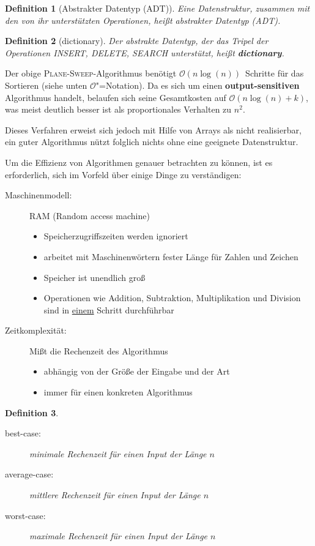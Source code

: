 \documentclass[ngerman,draft,parskip=half*,twoside]{scrreprt}
\theoremstyle{break}
\newtheorem{definition}{Definition}[chapter]
\theoremstyle{nonumberbreak}
\newcommand*{\OO}{\mathcal{O}}      %
\begin{document}
\begin{definition}[Abstrakter Datentyp (ADT)]
  Eine Datenstruktur, zusammen mit den von ihr unterstützten Operationen, 
  heißt abstrakter Datentyp (ADT).
\end{definition}

\begin{definition}[dictionary]
  Der abstrakte Datentyp, der das Tripel der Operationen \textit{INSERT},
  \textit{DELETE}, \textit{SEARCH} unterstützt, heißt \textbf{dictionary}.
\end{definition}

Der obige \textsc{Plane-Sweep}-Algorithmus benötigt $\OO(n\log(n))$~Schritte
für das Sortieren (siehe unten $\OO$"=Notation). Da es sich um einen \textbf{output-sensitiven}
Algorithmus handelt, belaufen sich seine Gesamtkosten auf
$\OO(n\log(n)+k)$, was meist deutlich besser ist als proportionales Verhalten
zu $n^2$.

Dieses Verfahren erweist sich jedoch mit Hilfe von Arrays als nicht
realisierbar, ein guter Algorithmus nützt folglich nichts ohne eine
geeignete Datenstruktur.

Um die Effizienz von Algorithmen genauer betrachten zu können, ist es
erforderlich, sich im Vorfeld über einige Dinge zu verständigen:

\begin{description}
 \item[Maschinenmodell:] RAM (Random access machine)
  \begin{itemize}
   \item Speicherzugriffszeiten werden ignoriert
   \item arbeitet mit Maschinenwörtern fester Länge für Zahlen und Zeichen
   \item Speicher ist unendlich groß
   \item Operationen wie Addition, Subtraktion, Multiplikation und Division
    sind in \underline{einem} Schritt durchführbar
  \end{itemize}
 \item[Zeitkomplexität:] Mißt die Rechenzeit des Algorithmus
  \begin{itemize}
   \item{abhängig von der Größe der Eingabe und der Art}
   \item{immer für einen konkreten Algorithmus}
  \end{itemize}
\end{description}

\begin{definition}
  \begin{description}
   \item[best-case:] minimale Rechenzeit für einen Input der Länge $n$
   \item[average-case:] mittlere Rechenzeit für einen Input der Länge $n$
   \item[worst-case:] maximale Rechenzeit für einen Input der Länge $n$
  \end{description}
\end{definition}
\end{document}
